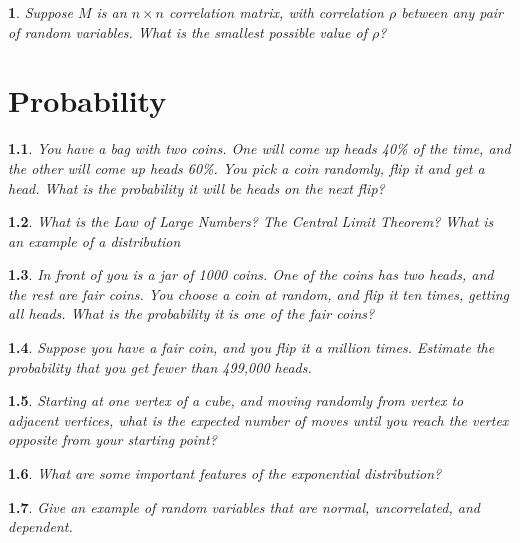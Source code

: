 \documentclass{report}
\newtheorem{problem}{}
\numberwithin{problem}{chapter} %
\begin{document}
\begin{problem}
Suppose $M$ is an $n\times n$ correlation matrix, with correlation $\rho$ between any pair of random variables. What is the smallest possible value of $\rho$?
\end{problem}

\chapter{Probability}

\begin{problem}
You have a bag with two coins. One will come up heads 40\% of the time, and the other will come up heads 60\%. You pick a coin randomly, flip it and get a head. What is the probability it will be heads on the next flip?
\end{problem}

\begin{problem}
What is the Law of Large Numbers? The Central Limit Theorem? What is an example of a distribution 
\end{problem}

\begin{problem}
In front of you is a jar of 1000 coins. One of the coins has two heads, and the rest are fair coins. You choose a coin at random, and flip it ten times, getting all heads. What is the probability it is one of the fair coins?
\end{problem}

\begin{problem}
Suppose you have a fair coin, and you flip it a million times. Estimate the probability that you get fewer than 499,000 heads.
\end{problem}

\begin{problem}
\cite{STRAWA}
Starting at one vertex of a cube, and moving randomly from vertex to adjacent vertices, what is the expected number of moves until you reach the  vertex opposite from your starting point?
\end{problem}

\begin{problem}
What are some important features of the exponential distribution?
\end{problem}

\begin{problem}
Give an example of random variables that are normal, uncorrelated, and dependent.
\end{problem}
\end{document}

